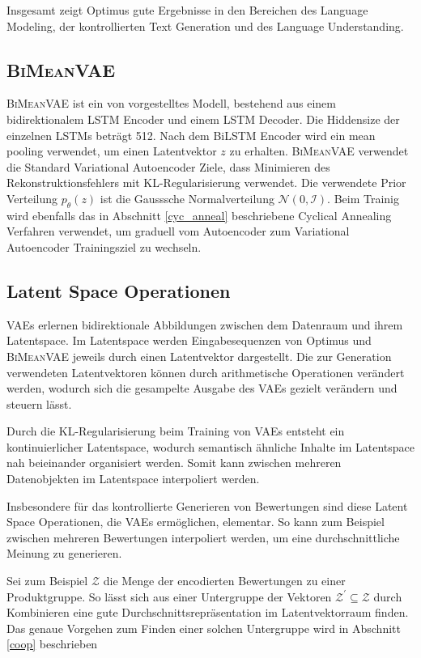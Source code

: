 Insgesamt zeigt Optimus gute Ergebnisse in den Bereichen des Language Modeling, der kontrollierten Text Generation und des Language Understanding.



\pagebreak
\subsection{\textsc{BiMeanVAE}}
\textsc{BiMeanVAE} ist ein von \citep{coop} vorgestelltes Modell, bestehend aus einem bidirektionalem LSTM Encoder und einem LSTM Decoder. 
Die Hiddensize der einzelnen LSTMs beträgt 512. Nach dem BiLSTM Encoder wird ein mean pooling verwendet, um einen Latentvektor $z$ zu erhalten.
\textsc{BiMeanVAE} verwendet die Standard Variational Autoencoder Ziele, dass Minimieren des Rekonstruktionsfehlers mit KL-Regularisierung verwendet.
Die verwendete Prior Verteilung $p_\theta(z)$ ist die Gausssche Normalverteilung $\mathcal{N}(0,\mathcal{I})$. 
Beim Trainig wird ebenfalls das in Abschnitt \ref{cyc_anneal} beschriebene Cyclical Annealing Verfahren verwendet, um graduell vom Autoencoder zum Variational Autoencoder Trainingsziel zu wechseln.


\subsection{Latent Space Operationen}
VAEs erlernen bidirektionale Abbildungen zwischen dem Datenraum und ihrem Latentspace. 
Im Latentspace werden Eingabesequenzen von Optimus und \textsc{BiMeanVAE} jeweils durch einen Latentvektor dargestellt.
Die zur Generation verwendeten Latentvektoren können durch arithmetische Operationen verändert werden, wodurch sich die gesampelte Ausgabe des VAEs gezielt verändern und steuern lässt.

Durch die KL-Regularisierung beim Training von VAEs entsteht ein kontinuierlicher Latentspace, wodurch semantisch ähnliche Inhalte im Latentspace nah beieinander organisiert werden.
Somit kann zwischen mehreren Datenobjekten im Latentspace interpoliert werden.

Insbesondere für das kontrollierte Generieren von Bewertungen sind diese Latent Space Operationen, die VAEs ermöglichen, elementar.
So kann zum Beispiel zwischen mehreren Bewertungen interpoliert werden, um eine durchschnittliche Meinung zu generieren.

Sei zum Beispiel $\mathcal{Z}$ die Menge der encodierten Bewertungen zu einer Produktgruppe.
So lässt sich aus einer Untergruppe der Vektoren $\mathcal{Z}^{'} \subseteq \mathcal{Z}$ durch Kombinieren eine gute Durchschnittsrepräsentation im Latentvektorraum finden.
Das genaue Vorgehen zum Finden einer solchen Untergruppe wird in Abschnitt \ref{coop} beschrieben
\pagebreak
